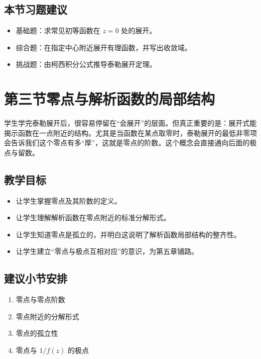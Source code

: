 \subsection*{本节习题建议}
\begin{itemize}
    \item 基础题：求常见初等函数在 $z=0$ 处的展开。
    \item 综合题：在指定中心附近展开有理函数，并写出收敛域。
    \item 挑战题：由柯西积分公式推导泰勒展开定理。
\end{itemize}

\section{第三节\quad 零点与解析函数的局部结构}

\begin{wulibj}[本节要解决的问题]
学生学完泰勒展开后，很容易停留在``会展开''的层面。但真正重要的是：展开式能揭示函数在一点附近的结构。尤其是当函数在某点取零时，泰勒展开的最低非零项会告诉我们这个零点有多``厚''，这就是零点的阶数。这个概念会直接通向后面的极点与留数。
\end{wulibj}

\subsection*{教学目标}
\begin{itemize}
    \item 让学生掌握零点及其阶数的定义。
    \item 让学生理解解析函数在零点附近的标准分解形式。
    \item 让学生知道零点是孤立的，并明白这说明了解析函数局部结构的整齐性。
    \item 让学生建立``零点与极点互相对应''的意识，为第五章铺路。
\end{itemize}

\subsection*{建议小节安排}
\begin{enumerate}
    \item 零点与零点阶数
    \item 零点附近的分解形式
    \item 零点的孤立性
    \item 零点与 $1/f(z)$ 的极点
\end{enumerate}

